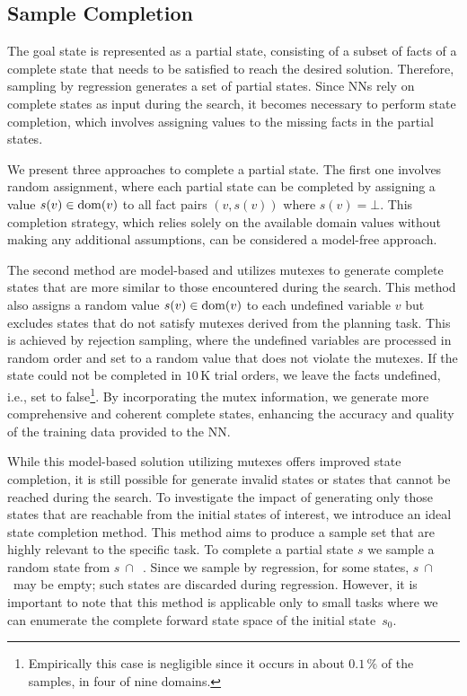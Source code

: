 \subsection{Sample Completion}
\label{sec:sample-completion}

The goal state is represented as a partial state, consisting of a subset of facts of a complete state that needs to be satisfied to reach the desired solution. Therefore, sampling by regression generates a set of partial states. Since NNs rely on complete states as input during the search, it becomes necessary to perform state completion, which involves assigning values to the missing facts in the partial states.

We present three approaches to complete a partial state. The first one involves random assignment, where each partial state can be completed by assigning a value $s(v)\in\operatorname{dom}(v)$ to all fact pairs $(v,s(v))$ where $s(v)=\bot$. This completion strategy, which relies solely on the available domain values without making any additional assumptions, can be considered a model-free approach.

The second method are model-based and utilizes mutexes to generate complete states that are more similar to those encountered during the search. This method also assigns a random value $s(v)\in\operatorname{dom}(v)$ to each undefined variable $v$ but excludes states that do not satisfy mutexes derived from the planning task. This is achieved by rejection sampling, where the undefined variables are processed in random order and set to a random value that does not violate the mutexes. If the state could not be completed in $10$\,K trial orders, we leave the facts undefined, i.e., set to false\footnote{Empirically this case is negligible since it occurs in about $0.1\,\%$ of the samples, in four of nine domains.}. By incorporating the mutex information, we generate more comprehensive and coherent complete states, enhancing the accuracy and quality of the training data provided to the NN.

While this model-based solution utilizing mutexes offers improved state completion, it is still possible for generate invalid states or states that cannot be reached during the search. To investigate the impact of generating only those states that are reachable from the initial states of interest, we introduce an ideal state completion method. This method aims to produce a sample set that are highly relevant to the specific task. To complete a partial state $s$ we sample a random state from $s~\cap$~\fssp. Since we sample by regression, for some states, $s~\cap$~\fssp may be empty; such states are discarded during regression. However, it is important to note that this method is applicable only to small tasks where we can enumerate the complete forward state space \fssp of the initial state~$s_0$.

